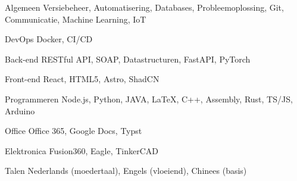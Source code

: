 
\begin{cvskills}

    \cvskill
    {Algemeen} %
    {Versiebeheer, Automatisering, Databases, Probleemoplossing, Git, Communicatie, Machine Learning, IoT} %

    \cvskill
    {DevOps} %
    {Docker, CI/CD} %

    \cvskill
    {Back-end} %
    {RESTful API, SOAP, Datastructuren, FastAPI, PyTorch} %

    \cvskill
    {Front-end} %
    {React, HTML5, Astro, ShadCN} %

    \cvskill
    {Programmeren} %
    {Node.js, Python, JAVA, LaTeX, C++, Assembly, Rust, TS/JS, Arduino} %

    \cvskill
    {Office} %
    {Office 365, Google Docs, Typst} %

    \cvskill
    {Elektronica} %
    {Fusion360, Eagle, TinkerCAD} %

    \cvskill
    {Talen} %
    {Nederlands (moedertaal), Engels (vloeiend), Chinees (basis)} %
\end{cvskills}
